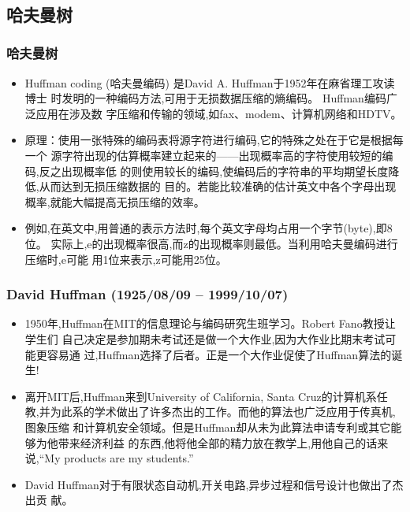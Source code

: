 \begin{frame}
  ~  
\end{frame}

\subsection{哈夫曼树}
\begin{frame}[fragile]
  \frametitle{哈夫曼树}
  \small
  \begin{itemize}
  \item Huffman coding (哈夫曼编码) 是David A. Huffman于1952年在麻省理工攻读博士
    时发明的一种编码方法,可用于无损数据压缩的熵编码。 Huffman编码广泛应用在涉及数
    字压缩和传输的领域,如fax、modem、计算机网络和HDTV。
  \item 原理：使用一张特殊的编码表将源字符进行编码,它的特殊之处在于它是根据每一个
    源字符出现的估算概率建立起来的——出现概率高的字符使用较短的编码,反之出现概率低
    的则使用较长的编码,使编码后的字符串的平均期望长度降低,从而达到无损压缩数据的
    目的。若能比较准确的估计英文中各个字母出现概率,就能大幅提高无损压缩的效率。
  \item 例如,在英文中,用普通的表示方法时,每个英文字母均占用一个字节(byte),即8位。
    实际上,e的出现概率很高,而z的出现概率则最低。当利用哈夫曼编码进行压缩时,e可能
    用1位来表示,z可能用25位。
  \end{itemize}
\end{frame}

\begin{frame}[fragile]
  \frametitle{David Huffman (1925/08/09 -- 1999/10/07)}
  \begin{itemize}
  \item 1950年,Huffman在MIT的信息理论与编码研究生班学习。Robert Fano教授让学生们
    自己决定是参加期未考试还是做一个大作业,因为大作业比期末考试可能更容易通
    过,Huffman选择了后者。正是一个大作业促使了Huffman算法的诞生!
  \item 离开MIT后,Huffman来到University of California, Santa Cruz的计算机系任
    教,并为此系的学术做出了许多杰出的工作。而他的算法也广泛应用于传真机,图象压缩
    和计算机安全领域。但是Huffman却从未为此算法申请专利或其它能够为他带来经济利益
    的东西,他将他全部的精力放在教学上,用他自己的话来说,“My products are my
    students.”
  \item David Huffman对于有限状态自动机,开关电路,异步过程和信号设计也做出了杰出贡
    献。
  \end{itemize}
\end{frame}

